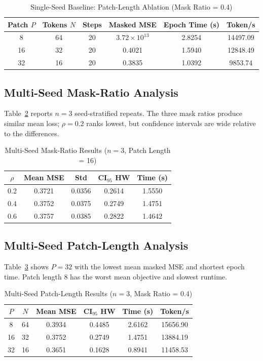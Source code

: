 \documentclass[journal]{IEEEtran}
\begin{document}
\begin{table}[t]
\caption{Single-Seed Baseline: Patch-Length Ablation (Mask Ratio = 0.4)}
\label{tab:patch_ablation}
\centering
\begin{tabular}{cccccc}
\toprule
Patch $P$ & Tokens $N$ & Steps & Masked MSE & Epoch Time (s) & Token/s \\
\midrule
8  & 64 & 20 & $3.72\times10^{13}$ & 2.8254 & 14497.09 \\
16 & 32 & 20 & 0.4021 & 1.5940 & 12848.49 \\
32 & 16 & 20 & 0.3835 & 1.0392 & 9853.74 \\
\bottomrule
\end{tabular}
\end{table}

\subsection{Multi-Seed Mask-Ratio Analysis}
Table~\ref{tab:mask_multiseed} reports $n=3$ seed-stratified repeats. The three mask ratios produce similar mean loss; $\rho=0.2$ ranks lowest, but confidence intervals are wide relative to the differences.

\begin{table}[t]
\caption{Multi-Seed Mask-Ratio Results ($n=3$, Patch Length = 16)}
\label{tab:mask_multiseed}
\centering
\begin{tabular}{ccccc}
\toprule
$\rho$ & Mean MSE & Std & CI$_{95}$ HW & Time (s) \\
\midrule
0.2 & 0.3721 & 0.0356 & 0.2614 & 1.5550 \\
0.4 & 0.3752 & 0.0375 & 0.2749 & 1.4751 \\
0.6 & 0.3757 & 0.0385 & 0.2822 & 1.4642 \\
\bottomrule
\end{tabular}
\end{table}

\subsection{Multi-Seed Patch-Length Analysis}
Table~\ref{tab:patch_multiseed} shows $P=32$ with the lowest mean masked MSE and shortest epoch time. Patch length 8 has the worst mean objective and slowest runtime.

\begin{table}[t]
\caption{Multi-Seed Patch-Length Results ($n=3$, Mask Ratio = 0.4)}
\label{tab:patch_multiseed}
\centering
\scriptsize
\begin{tabular}{cccccc}
\toprule
$P$ & $N$ & Mean MSE & CI$_{95}$ HW & Time (s) & Token/s \\
\midrule
8  & 64 & 0.3934 & 0.4485 & 2.6162 & 15656.90 \\
16 & 32 & 0.3752 & 0.2749 & 1.4751 & 13884.19 \\
32 & 16 & 0.3651 & 0.1628 & 0.8941 & 11458.53 \\
\bottomrule
\end{tabular}
\end{table}
\end{document}

